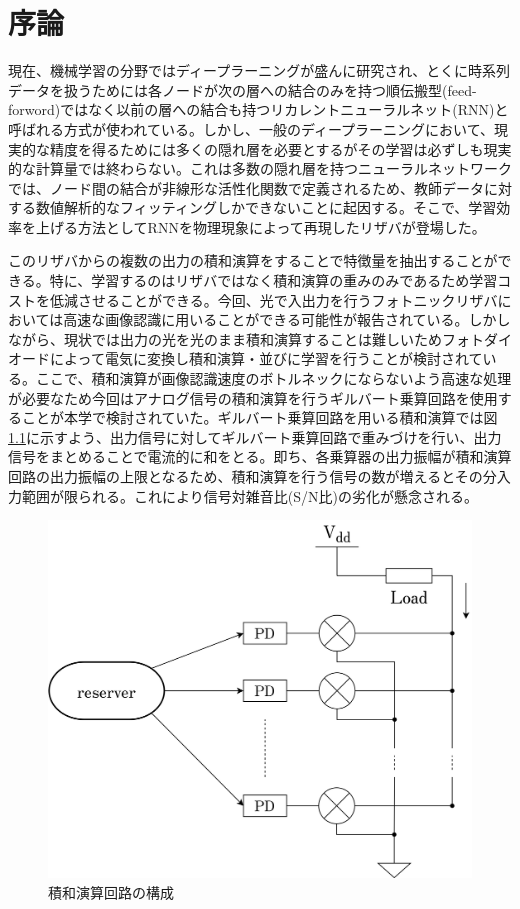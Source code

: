 \chapter{序論}
現在、機械学習の分野ではディープラーニングが盛んに研究され、とくに時系列データを扱うためには各ノードが次の層への結合のみを持つ順伝搬型(feed-forword)ではなく以前の層への結合も持つリカレントニューラルネット(RNN)と呼ばれる方式が使われている。しかし、一般のディープラーニングにおいて、現実的な精度を得るためには多くの隠れ層を必要とするがその学習は必ずしも現実的な計算量では終わらない。これは多数の隠れ層を持つニューラルネットワークでは、ノード間の結合が非線形な活性化関数で定義されるため、教師データに対する数値解析的なフィッティングしかできないことに起因する。そこで、学習効率を上げる方法としてRNNを物理現象によって再現したリザバが登場した。\par
このリザバからの複数の出力の積和演算をすることで特徴量を抽出することができる。特に、学習するのはリザバではなく積和演算の重みのみであるため学習コストを低減させることができる。今回、光で入出力を行うフォトニックリザバにおいては高速な画像認識に用いることができる可能性が報告されている。しかしながら、現状では出力の光を光のまま積和演算することは難しいためフォトダイオードによって電気に変換し積和演算・並びに学習を行うことが検討されている。ここで、積和演算が画像認識速度のボトルネックにならないよう高速な処理が必要なため今回はアナログ信号の積和演算を行うギルバート乗算回路を使用することが本学で検討されていた。ギルバート乗算回路を用いる積和演算では図\ref{fig:1_config}に示すよう、出力信号に対してギルバート乗算回路で重みづけを行い、出力信号をまとめることで電流的に和をとる。即ち、各乗算器の出力振幅が積和演算回路の出力振幅の上限となるため、積和演算を行う信号の数が増えるとその分入力範囲が限られる。これにより信号対雑音比(S/N比)の劣化が懸念される。
\begin{figure}
        \begin{center}
        \includegraphics[width=160mm]{figures/chapter1/config.png}
        \caption{積和演算回路の構成}
        \label{fig:1_config}
    \end{center}
\end{figure}
